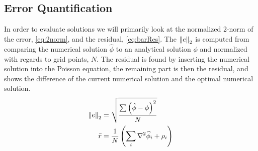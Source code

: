 

\subsection{Error Quantification}
	\label{sec:errorQuant}
	In order to evaluate solutions we will primarily look at the normalized 2-norm of the error, \cref{eq:2norm},
	and the residual, \cref{eq:barRes}. The \(\norm{ e }_2\) is computed from comparing the numerical
	solution \(\widehat{\phi}\) to an analytical solution \(\phi\) and normalized with regards to grid points, \(N\).
	The residual is found by inserting the numerical solution into the Poisson equation, the remaining
	part is then the residual, and shows the difference of the current numerical solution
	and the optimal numerical solution.
	\begin{align}
		\norm{ e }_2&= \sqrt{\frac{\sum \left(\hat\phi - \phi\right)^2}{N}}  \label{eq:2norm}
		\\
		\bar{r} &= \frac{1}{N}\left( \sum_i{ \nabla^2 \widehat{\phi}_i + \rho_i  }  \right) \label{eq:barRes}
	\end{align}
